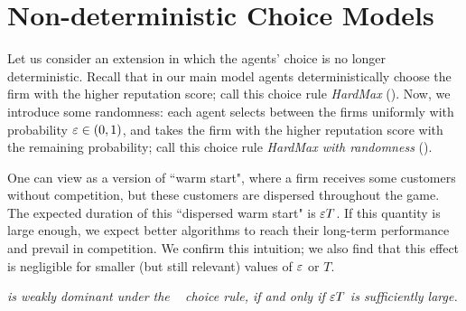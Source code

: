 \documentclass[../competing_bandits.tex]{subfiles}
\begin{document}
\section{Non-deterministic Choice Models}\label{sec:non_greedy}

Let us consider an extension in which the agents' choice is no longer deterministic. Recall that in our main model agents deterministically choose the firm with the higher reputation score; call this choice rule \emph{HardMax} (\HM). Now, we introduce some randomness: each agent selects between the firms uniformly with probability $\varepsilon\in (0,1)$, and takes the firm with the higher reputation score with the remaining probability; call this choice rule \emph{HardMax with randomness} (\HMR).

One can view \HMR as a version of ``warm start", where a firm receives some customers without competition, but these customers are dispersed throughout the game. The expected duration of this ``dispersed warm start" is $\varepsilon T$. If this quantity is large enough, we expect better algorithms to reach their long-term performance and prevail in competition. We confirm this intuition; we also find that this effect is negligible for smaller (but still relevant) values of $\varepsilon$ or $T$.


\begin{finding}\label{find:non_greedy_choice}
\textit{\TS is weakly dominant under the \HMR~ choice rule, if and only if $\varepsilon T$ is sufficiently large. }
\end{finding}
\end{document}
